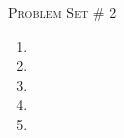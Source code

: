 \documentclass[12pt]{article}
\newenvironment{questions}{\begin{enumerate}}{\end{enumerate}}
\newcommand{\question}{\item}
\begin{document}
\null
\vspace{-1cm}
\begin{center}\LARGE \textsc{Problem Set} \# 2 \end{center}

\begin{questions}
    \question  \newpage \null 
    \question  \newpage \null 
    \question  \newpage \null 
    \question  \newpage \null 
    \question  \newpage \null
\end{questions}




\end{document}
